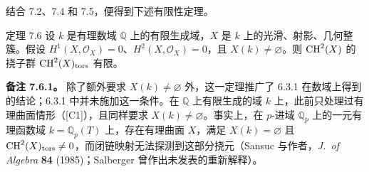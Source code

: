 结合 7.2、7.4 和 7.5，便得到下述有限性定理。
\begin{statement}{定理 7.6}
设 $k$ 是有理数域 $\mathbb Q$ 上的有限生成域，$X$ 是 $k$ 上的光滑、射影、几何整簇。假设 $H^1(X,\mathcal O_X)=0$、$H^2(X,\mathcal O_X)=0$，且 $X(k)\ne\varnothing$。则 $\operatorname{CH}^2(X)$ 的挠子群 $\operatorname{CH}^2(X)_{\mathrm{tors}}$ 有限。
\end{statement}

\noindent\textbf{备注 7.6.1。} 除了额外要求 $X(k)\ne\varnothing$ 外，这一定理推广了 6.3.1 在数域上得到的结论；6.3.1 中并未施加这一条件。在 $\mathbb Q$ 上有限生成的域 $k$ 上，此前只处理过有理曲面情形（[C1]），且同样要求 $X(k)\ne\varnothing$。事实上，在 $p$-进域 $\mathbb Q_p$ 上的一元有理函数域 $k=\mathbb Q_p(T)$ 上，存在有理曲面 $X$，满足 $X(k)=\varnothing$ 且 $\operatorname{CH}^2(X)_{\mathrm{tors}}\ne0$，而闭链映射无法探测到这部分挠元（Sansuc 与作者，\textit{J.~of Algebra} \textbf{84} (1985)；Salberger 曾作出未发表的重新解释）。

